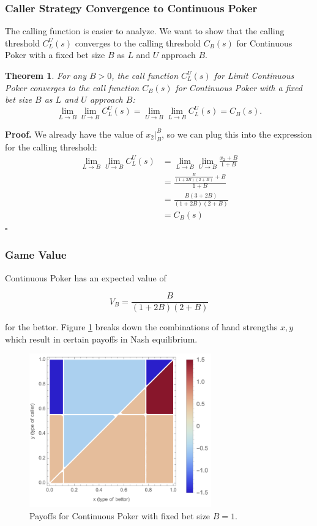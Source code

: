 \documentclass[a4paper,12pt]{article}
\theoremstyle{plain}
\newtheorem{theorem}{Theorem}[section]
\theoremstyle{definition}
\newenvironment{customproof}[1][Proof]{\noindent\textbf{#1.} }{\hfill$\square$\vspace{1em}}
\begin{document}
\subsubsection{Caller Strategy Convergence to Continuous Poker}

The calling function is easier to analyze. We want to show that the calling threshold $C_L^U(s)$ converges to the calling threshold $C_B(s)$ for Continuous Poker with a fixed bet size $B$ as $L$ and $U$ approach $B$.

\begin{theorem}
     For any $B > 0$, the call function $C_L^U(s)$ for Limit Continuous Poker converges to the call function $C_B(s)$ for Continuous Poker with a fixed bet size $B$ as $L$ and $U$ approach $B$:
\[
\lim_{L \to B} \lim_{U \to B} C_L^U(s) = \lim_{U \to B} \lim_{L \to B} C_L^U(s) = C_B(s).
\]
\end{theorem}

\begin{customproof}
We already have the value of $x_2|_B^B$, so we can plug this into the expression for the calling threshold:
\begin{align*}
    \lim_{L \to B} \lim_{U \to B} C_L^U(s) & = \lim_{L \to B} \lim_{U \to B} \frac{x_2+B}{1+B} \\
    & = \frac{\frac{B}{(1+2B)(2+B)} + B}{1+B} \\
    & = \frac{B(3+2B)}{(1+2B)(2+B)} \\
    & = C_B(s)
\end{align*}
\end{customproof}

\subsubsection{Game Value}

Continuous Poker has an expected value of 

$$ V_B = \frac{B}{(1+2B)(2+B)} $$

for the bettor. Figure \ref{fig:payoff} breaks down the combinations of hand strengths $x, y$ which result in certain payoffs in Nash equilibrium.

\begin{figure}[h!]
    \centering
    \includegraphics[width=0.7\textwidth]{payoff_plot_s_1.png}
    \caption{Payoffs for Continuous Poker with fixed bet size $B=1$.}
    \label{fig:payoff}
\end{figure}
\end{document}
